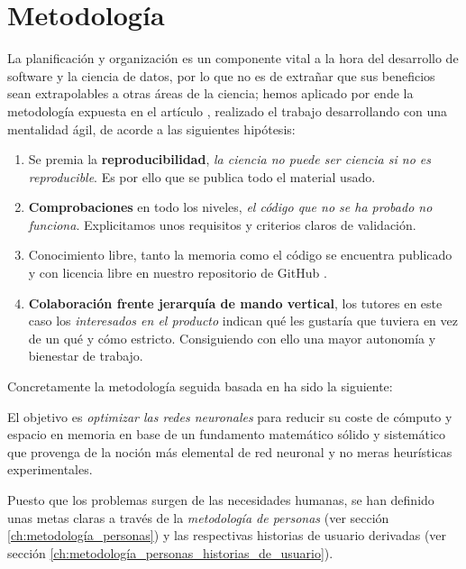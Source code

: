 %

\chapter{Metodología}

La planificación y organización es un componente vital a la hora del desarrollo de software 
y la ciencia de datos, por lo que no es de extrañar que sus beneficios sean extrapolables
a otras áreas de la ciencia; 
hemos aplicado por ende la 
metodología expuesta en el artículo \cite{DBLP:journals/corr/abs-2104-12545}, realizado 
el trabajo desarrollando con una mentalidad ágil, de acorde a las siguientes hipótesis: 

\begin{enumerate}
    \item Se premia la \textbf{reproducibilidad}, \textit{la ciencia no puede ser ciencia si no es reproducible}. Es por 
    ello que se publica todo el material usado. 
    \item \textbf{Comprobaciones} en todo los niveles, \textit{el código que no se ha probado no funciona}. 
    Explicitamos unos requisitos y criterios claros de validación. 
    \item Conocimiento libre, tanto la memoria como el código se encuentra publicado y con licencia libre en nuestro repositorio 
    de GitHub \cite{TFG-Estudio-de-las-redes-neuronales}.
    \item \textbf{Colaboración frente jerarquía de mando vertical}, los tutores en este caso 
    los \textit{interesados en el producto} 
    indican qué les gustaría que tuviera en vez de un qué y cómo estricto. Consiguiendo con ello una mayor autonomía y bienestar de trabajo.
     
\end{enumerate}  
 

Concretamente la metodología seguida basada en \cite{que-es-un-trabajo-fin-de-x} ha sido la siguiente: 


El objetivo es  \textit{optimizar las redes neuronales} para reducir su coste de cómputo 
y espacio en memoria en base de
un fundamento matemático sólido y sistemático que provenga de
la noción más elemental de red neuronal y no meras heurísticas experimentales.

Puesto que los problemas surgen de las necesidades humanas,
se han definido unas metas claras a través de la \textit{metodología de personas} 
(ver sección \ref{ch:metodología_personas}) \cite{personas-why-and-how-you-should-use-them}
y las respectivas historias de usuario derivadas (ver sección \ref{ch:metodología_personas_historias_de_usuario}).   

